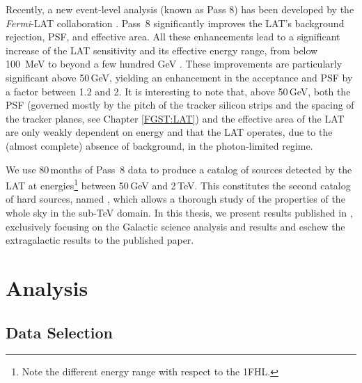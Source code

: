 Recently, a new event-level  analysis (known as Pass 8) has been developed by the \emph{Fermi}-LAT collaboration \citep{atwood13b,atwood13}. Pass~8 significantly improves the LAT's background rejection, PSF, and effective area. All these  enhancements lead to a significant increase of the LAT sensitivity and its effective energy range, from below 100~MeV to beyond a few hundred GeV  \citep{atwood13b,atwood13}. These improvements are particularly significant above 50\,GeV, yielding an enhancement in the acceptance and PSF by a factor  between 1.2 and 2. 
It is interesting to note that, above 50\,GeV, both the PSF (governed mostly by the pitch of the tracker silicon strips and the spacing of the tracker planes, see Chapter \ref{FGST:LAT}) and the effective area of the LAT are only weakly dependent on energy and that the LAT 
operates, due to the (almost complete) absence of background, in the photon-limited regime.

We use 80\,months of Pass~8 data to produce a catalog of sources detected by the LAT at energies\footnote{Note the different energy range with respect to the 1FHL.} between 50\,GeV and 2\,TeV. This constitutes the second catalog of hard \lat sources, named \twofhl{}, which allows a thorough study of the properties of the whole sky in the sub-TeV domain. In this thesis, we present results published in \cite{2FHL}, exclusively focusing on the Galactic science analysis and results and eschew the extragalactic results to the published \twofhl{} paper.


%
%
\section{Analysis}
\label{sec:analysis}


%
%

\subsection{\label{sec:data_sel}Data Selection}


